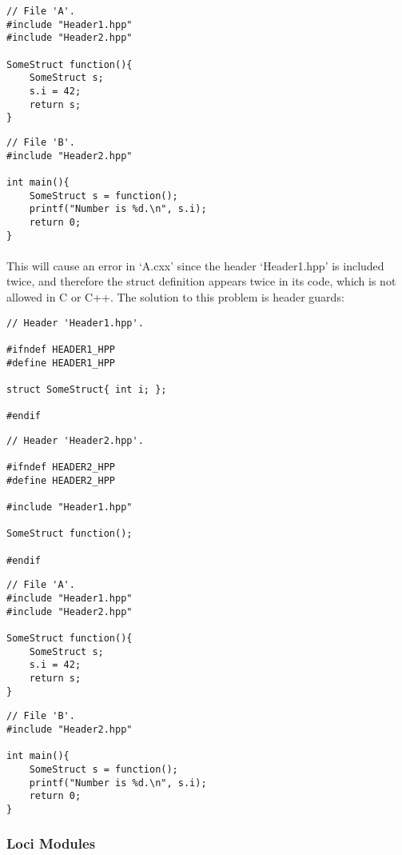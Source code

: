 \documentclass[12pt,twoside,notitlepage]{report}
\begin{document}
\begin{lstlisting}
// File 'A'.
#include "Header1.hpp"
#include "Header2.hpp"

SomeStruct function(){
	SomeStruct s;
	s.i = 42;
	return s;
}
\end{lstlisting}

\begin{lstlisting}
// File 'B'.
#include "Header2.hpp"

int main(){
	SomeStruct s = function();
	printf("Number is %d.\n", s.i);
	return 0;
}
\end{lstlisting}

\paragraph{}
This will cause an error in `A.cxx' since the header `Header1.hpp' is included twice, and therefore the struct definition appears twice in its code, which is not allowed in C or C++. The solution to this problem is header guards:

\begin{lstlisting}
// Header 'Header1.hpp'.

#ifndef HEADER1_HPP
#define HEADER1_HPP

struct SomeStruct{ int i; };

#endif
\end{lstlisting}

\begin{lstlisting}
// Header 'Header2.hpp'.

#ifndef HEADER2_HPP
#define HEADER2_HPP

#include "Header1.hpp"

SomeStruct function();

#endif
\end{lstlisting}

\begin{lstlisting}
// File 'A'.
#include "Header1.hpp"
#include "Header2.hpp"

SomeStruct function(){
	SomeStruct s;
	s.i = 42;
	return s;
}
\end{lstlisting}

\begin{lstlisting}
// File 'B'.
#include "Header2.hpp"

int main(){
	SomeStruct s = function();
	printf("Number is %d.\n", s.i);
	return 0;
}
\end{lstlisting}

\subsubsection{Loci Modules}
\end{document}
